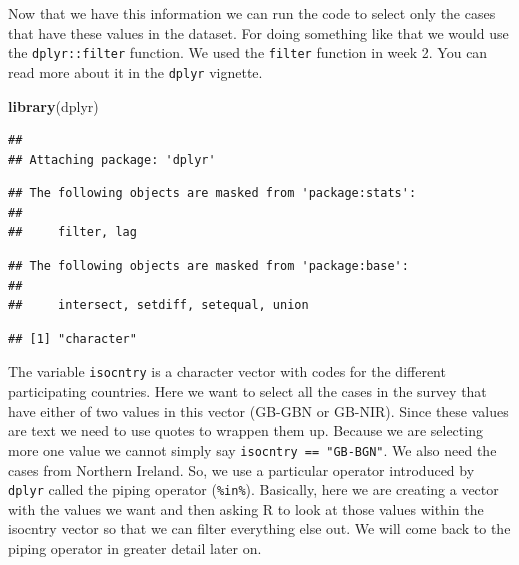\documentclass[]{book}
\newenvironment{Shaded}{\begin{snugshade}}{\end{snugshade}}
\newcommand{\CommentTok}[1]{\textcolor[rgb]{0.56,0.35,0.01}{\textit{#1}}}
\newcommand{\DecValTok}[1]{\textcolor[rgb]{0.00,0.00,0.81}{#1}}
\newcommand{\KeywordTok}[1]{\textcolor[rgb]{0.13,0.29,0.53}{\textbf{#1}}}
\newcommand{\NormalTok}[1]{#1}
\newcommand{\OperatorTok}[1]{\textcolor[rgb]{0.81,0.36,0.00}{\textbf{#1}}}
\newcommand{\StringTok}[1]{\textcolor[rgb]{0.31,0.60,0.02}{#1}}
\theoremstyle{definition}
\theoremstyle{definition}
\theoremstyle{definition}
\theoremstyle{remark}
\begin{document}
Now that we have this information we can run the code to select only the
cases that have these values in the dataset. For doing something like
that we would use the \texttt{dplyr::filter} function. We used the
\texttt{filter} function in week 2. You can read more about it in the
\texttt{dplyr} vignette.

\begin{Shaded}
\begin{Highlighting}[]
\KeywordTok{library}\NormalTok{(dplyr)}
\end{Highlighting}
\end{Shaded}

\begin{verbatim}
## 
## Attaching package: 'dplyr'
\end{verbatim}

\begin{verbatim}
## The following objects are masked from 'package:stats':
## 
##     filter, lag
\end{verbatim}

\begin{verbatim}
## The following objects are masked from 'package:base':
## 
##     intersect, setdiff, setequal, union
\end{verbatim}

\begin{Shaded}
\end{Shaded}

\begin{verbatim}
## [1] "character"
\end{verbatim}

\begin{Shaded}
\end{Shaded}

The variable \texttt{isocntry} is a character vector with codes for the
different participating countries. Here we want to select all the cases
in the survey that have either of two values in this vector (GB-GBN or
GB-NIR). Since these values are text we need to use quotes to wrappen
them up. Because we are selecting more one value we cannot simply say
\texttt{isocntry\ ==\ "GB-BGN"}. We also need the cases from Northern
Ireland. So, we use a particular operator introduced by \texttt{dplyr}
called the piping operator (\texttt{\%in\%}). Basically, here we are
creating a vector with the values we want and then asking R to look at
those values within the isocntry vector so that we can filter everything
else out. We will come back to the piping operator in greater detail
later on.
\end{document}
